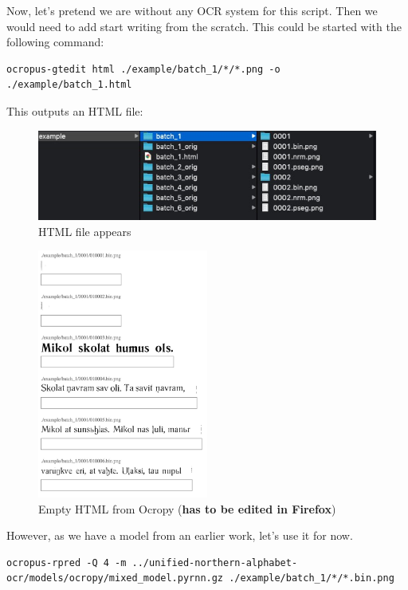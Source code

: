 \documentclass[]{book}
\begin{document}
Now, let's pretend we are without any OCR system for this script. Then we would need to add start writing from the scratch. This could be started with the following command:

\begin{verbatim}
ocropus-gtedit html ./example/batch_1/*/*.png -o ./example/batch_1.html
\end{verbatim}

This outputs an HTML file:

\begin{figure}
\centering
\includegraphics{./images/ocropy_created_html.jpg}
\caption{HTML file appears}
\end{figure}

\begin{figure}
\centering
\includegraphics[width=0.5\textwidth,height=\textheight]{./images/ocropy_empty_html.jpg}
\caption{Empty HTML from Ocropy (\textbf{has to be edited in Firefox})}
\end{figure}

However, as we have a model from an earlier work, let's use it for now.

\begin{verbatim}
ocropus-rpred -Q 4 -m ../unified-northern-alphabet-ocr/models/ocropy/mixed_model.pyrnn.gz ./example/batch_1/*/*.bin.png
\end{verbatim}
\end{document}
